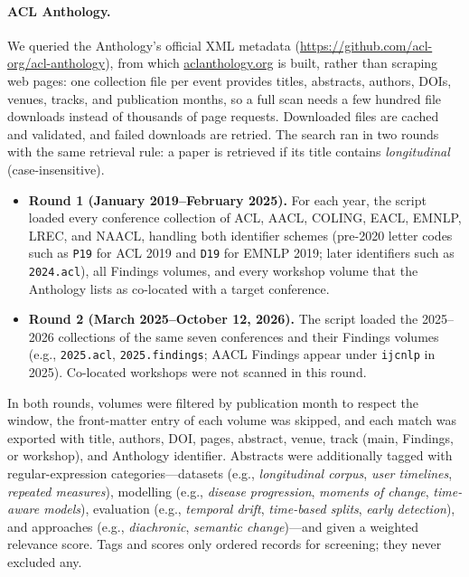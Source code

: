 \documentclass[11pt]{article}
\theoremstyle{plain}
\theoremstyle{definition}
\theoremstyle{remark}
\begin{document}
\paragraph{ACL Anthology.} We queried the Anthology's official XML metadata (\url{https://github.com/acl-org/acl-anthology}), from which \url{aclanthology.org} is built, rather than scraping web pages: one collection file per event provides titles, abstracts, authors, DOIs, venues, tracks, and publication months, so a full scan needs a few hundred file downloads instead of thousands of page requests. Downloaded files are cached and validated, and failed downloads are retried. The search ran in two rounds with the same retrieval rule: a paper is retrieved if its title contains \emph{longitudinal} (case-insensitive).
\begin{itemize}[leftmargin=*,nosep]
\item \textbf{Round 1 (January 2019--February 2025).} For each year, the script loaded every conference collection of ACL, AACL, COLING, EACL, EMNLP, LREC, and NAACL, handling both identifier schemes (pre-2020 letter codes such as \texttt{P19} for ACL 2019 and \texttt{D19} for EMNLP 2019; later identifiers such as \texttt{2024.acl}), all Findings volumes, and every workshop volume that the Anthology lists as co-located with a target conference.
\item \textbf{Round 2 (March 2025--October 12, 2026).} The script loaded the 2025--2026 collections of the same seven conferences and their Findings volumes (e.g., \texttt{2025.acl}, \texttt{2025.findings}; AACL Findings appear under \texttt{ijcnlp} in 2025). Co-located workshops were not scanned in this round.
\end{itemize}
In both rounds, volumes were filtered by publication month to respect the window, the front-matter entry of each volume was skipped, and each match was exported with title, authors, DOI, pages, abstract, venue, track (main, Findings, or workshop), and Anthology identifier. Abstracts were additionally tagged with regular-expression categories---datasets (e.g., \emph{longitudinal corpus}, \emph{user timelines}, \emph{repeated measures}), modelling (e.g., \emph{disease progression}, \emph{moments of change}, \emph{time-aware models}), evaluation (e.g., \emph{temporal drift}, \emph{time-based splits}, \emph{early detection}), and approaches (e.g., \emph{diachronic}, \emph{semantic change})---and given a weighted relevance score. Tags and scores only ordered records for screening; they never excluded any.
\end{document}
